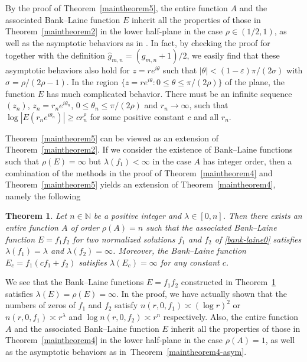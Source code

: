 \documentclass[12pt]{amsart}
\numberwithin{equation}{section}
\newtheorem{theorem}{Theorem}[section]
\begin{document}
By the proof of Theorem~\ref{maintheorem5}, the entire function $A$ and the associated Bank--Laine function $E$ inherit all the properties of those in Theorem~\ref{maintheorem2} in the lower half-plane in the case $\rho\in (1/2,1)$, as well as the asymptotic behaviors as in \cite[Theorem~3]{Zhang2024}. In fact, by checking the proof for \cite[Theorem~3]{Zhang2024} together with the definition $\hat{g}_{m,n}=(g_{m,n}+1)/2$, we easily find that these asymptotic behaviors also hold for $z=re^{i\theta}$ such that $|\theta|<(1-\varepsilon)\pi/(2\sigma)$ with $\sigma=\rho/(2\rho-1)$. In the region $\{z=re^{i\theta}: 0\leq \theta\leq\pi/(2\rho)\}$ of the plane, the function $E$ has much complicated behavior. There must be an infinite sequence $(z_n)$, $z_n=r_ne^{i\theta_n}$, $0\leq \theta_n\leq \pi/(2\rho)$ and $r_n\to\infty$, such that $\log |E(r_ne^{i\theta_n})|\geq cr_n^{\rho}$ for some positive constant $c$ and all $r_n$.

Theorem~\ref{maintheorem5} can be viewed as an extension of Theorem~\ref{maintheorem2}. If we consider the existence of Bank--Laine functions such that $\rho(E)=\infty$ but $\lambda(f_1)<\infty$ in the case $A$ has integer order, then a combination of the methods in the proof of Theorem~\ref{maintheorem4} and Theorem~\ref{maintheorem5} yields an extension of Theorem~\ref{maintheorem4}, namely the following

\begin{theorem}\label{maintheorem6}
Let $n\in \mathbb{N}$ be a positive integer and $\lambda\in[0,n]$. Then there exists an entire function $A$ of order $\rho(A)=n$ such that the associated Bank--Laine function $E=f_1f_2$ for two normalized solutions $f_1$ and $f_2$ of \eqref{bank-laine0} satisfies $\lambda(f_1)=\lambda$ and $\lambda(f_2)=\infty$. Moreover, the Bank--Laine function $E_c=f_1(cf_1+f_2)$ satisfies $\lambda(E_c)=\infty$ for any constant $c$.
\end{theorem}

We see that the Bank--Laine functions $E=f_1f_2$ constructed in Theorem~\ref{maintheorem6} satisfies $\lambda(E)=\rho(E)=\infty$. In the proof, we have actually shown that the numbers of zeros of $f_1$ and $f_2$ satisfy $n(r,0,f_1)\asymp (\log r)^2$ or $n(r,0,f_1)\asymp r^{\lambda}$ and $\log n(r,0,f_2)\asymp r^{n}$ respectively. Also, the entire function $A$ and the associated Bank--Laine function $E$ inherit all the properties of those in Theorem~\ref{maintheorem4} in the lower half-plane in the case $\rho(A)=1$, as well as the asymptotic behaviors as in~Theorem~\ref{maintheorem4-asym}.
\end{document}
